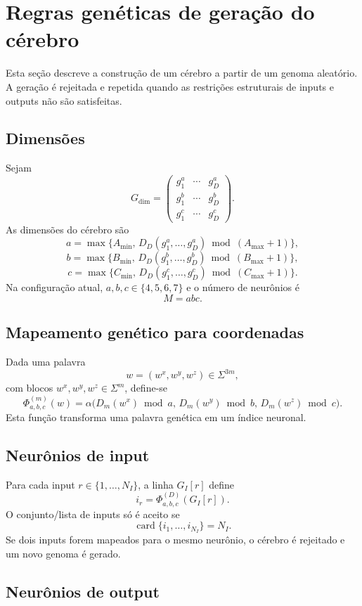 \documentclass[12pt,a4paper,fleqn]{article}
\newcommand{\SigmaGen}{\Sigma}
\newcommand{\card}{\operatorname{card}}
\begin{document}
\section{Regras genéticas de geração do cérebro}

Esta seção descreve a construção de um cérebro a partir de um genoma aleatório. A geração é rejeitada e repetida quando as restrições estruturais de inputs e outputs não são satisfeitas.

\subsection{Dimensões}

Sejam
$$
	G_{\dim}=
	\begin{pmatrix}
		g^a_1 & \cdots & g^a_D\\
		g^b_1 & \cdots & g^b_D\\
		g^c_1 & \cdots & g^c_D
	\end{pmatrix}.
$$
As dimensões do cérebro são
$$
	a=\max\{A_{\min},\,D_D(g^a_1,\ldots,g^a_D)\bmod(A_{\max}+1)\},
$$
$$
	b=\max\{B_{\min},\,D_D(g^b_1,\ldots,g^b_D)\bmod(B_{\max}+1)\},
$$
$$
	c=\max\{C_{\min},\,D_D(g^c_1,\ldots,g^c_D)\bmod(C_{\max}+1)\}.
$$
Na configuração atual, $a,b,c\in\{4,5,6,7\}$ e o número de neurônios é
$$
	M=abc.
$$

\subsection{Mapeamento genético para coordenadas}

Dada uma palavra
$$
	w=(w^x,w^y,w^z)\in\SigmaGen^{3m},
$$
com blocos $w^x,w^y,w^z\in\SigmaGen^m$, define-se
$$
	\Phi_{a,b,c}^{(m)}(w)
	=
	\alpha\big(
	D_m(w^x)\bmod a,\,
	D_m(w^y)\bmod b,\,
	D_m(w^z)\bmod c
	\big).
$$
Esta função transforma uma palavra genética em um índice neuronal.

\subsection{Neurônios de input}

Para cada input $r\in\{1,\ldots,N_I\}$, a linha $G_I[r]$ define
$$
	i_r = \Phi_{a,b,c}^{(D)}(G_I[r]).
$$
O conjunto/lista de inputs só é aceito se
$$
	\card\{i_1,\ldots,i_{N_I}\}=N_I.
$$
Se dois inputs forem mapeados para o mesmo neurônio, o cérebro é rejeitado e um novo genoma é gerado.

\subsection{Neurônios de output}
\end{document}
